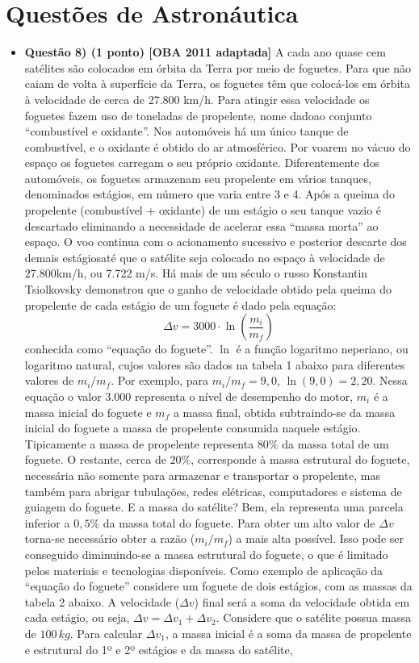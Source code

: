 \documentclass[a4paper, 12pt]{article}
\begin{document}
    \section*{Questões de Astronáutica}
        \begin{flushleft} \begin{itemize}
            \item \textbf{Questão 8) (1 ponto) [OBA 2011 adaptada]} A cada ano quase cem satélites são colocados em órbita da Terra por meio de foguetes. Para que não caiam de volta à superfície da Terra, os foguetes têm que colocá-los em órbita à velocidade de cerca de 27.800 km/h. Para atingir essa velocidade os foguetes fazem uso de toneladas de propelente, nome dadoao conjunto “combustível e oxidante”. Nos automóveis há um único tanque de combustível, e o oxidante é obtido do ar atmosférico. Por voarem no vácuo do espaço os foguetes carregam o seu próprio oxidante. Diferentemente dos automóveis, os foguetes armazenam seu propelente em vários tanques, denominados estágios, em número que varia entre 3 e 4. Após a queima do propelente (combustível + oxidante) de um estágio o seu tanque vazio é descartado eliminando a necessidade de acelerar essa “massa morta” ao espaço. O voo continua com o acionamento sucessivo e posterior descarte dos demais estágiosaté que o satélite seja colocado no espaço à velocidade de 27.800km/h, ou 7.722 m/s. Há mais de um século o russo Konstantin Tsiolkovsky demonstrou que o ganho de velocidade obtido pela queima do propelente de cada estágio de um foguete é dado pela equação: $$\Delta v = 3000 \cdot \ln \left(\frac{m_i}{m_f}\right)$$ conhecida como “equação do foguete”. $\ln$ é a função logaritmo neperiano, ou logaritmo natural, cujos valores são dados na tabela 1 abaixo para diferentes valores de $m_i/m_f$. Por exemplo, para $m_i/m_f=9,0$, $\ln(9,0)=2,20$. Nessa equação o valor $3.000$ representa o nível de desempenho do motor, $m_i$ é a massa inicial do foguete e $m_f$ a massa final, obtida subtraindo-se da massa inicial do foguete a massa de propelente consumida naquele estágio. Tipicamente a massa de propelente representa $80\%$ da massa total de um foguete. O restante, cerca de $20\%$, corresponde à massa estrutural do foguete, necessária não somente para armazenar e transportar o propelente, mas também para abrigar tubulações, redes elétricas, computadores e sistema de guiagem do foguete. E a massa do satélite? Bem, ela representa uma parcela inferior a $0,5\%$ da massa total do foguete. Para obter um alto valor de $\Delta v$ torna-se necessário obter a razão ($m_i/m_f$) a mais alta possível. Isso pode ser conseguido diminuindo-se a massa estrutural do foguete, o que é limitado pelos materiais e tecnologias disponíveis. Como exemplo de aplicação da “equação do foguete” considere um foguete de dois estágios, com as massas da tabela 2 abaixo. \linebreak \linebreak A velocidade ($\Delta v$) final será a soma da velocidade obtida em cada estágio, ou seja, $\Delta v =\Delta v_1+\Delta v_2$. Considere que o satélite possua massa de $100 \, kg$. Para calcular $\Delta v_1$, a massa inicial é a soma da massa de propelente e estrutural do 1º e 2º estágios e da massa do satélite, 
\end{itemize}
\end{flushleft}
\end{document}
